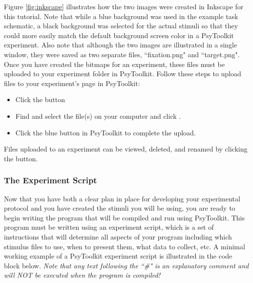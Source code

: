 Figure \ref{fig:inkscape} illustrates how the two images were created in Inkscape for this tutorial.  Note that while a blue background was used in the example task schematic, a black background was selected for the actual stimuli so that they could more easily match the default background screen color in a PsyToolkit experiment.  Also note that although the two images are illustrated in a single window, they were saved as two separate files, ``fixation.png" and ``target.png".  Once you have created the bitmaps for an experiment, these files must be uploaded to your experiment folder in PsyToolkit. Follow these steps to upload files to your experiment's page in PsyToolkit:
\begin{itemize}
    \item Click the  button
    \item Find and select the file(s) on your computer and click .
    \item Click the blue  button in PsyToolkit to complete the upload.
\end{itemize}
Files uploaded to an experiment can be viewed, deleted, and renamed by clicking the  button.

\subsubsection{The Experiment Script}
Now that you have both a clear plan in place for developing your experimental protocol and you have created the stimuli you will be using, you are ready to begin writing the program that will be compiled and run using PsyToolkit. This program must be written using an experiment script, which is a set of instructions that will determine all aspects of your program including which stimulus files to use, when to present them, what data to collect, etc.  A minimal working example of a PsyToolkit experiment script is illustrated in the code block below. \emph{Note that any text following the ``\#" is an explanatory comment and will NOT be executed when the program is compiled!}

